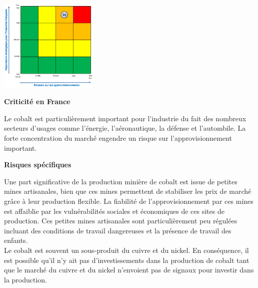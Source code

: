 \begin{multicols}{2}
    \begin{center}
      \includegraphics[width=0.35\textwidth]{Illustration métaux/Cobalt_criticité.png} 
    \end{center}
    \begin{center}
    \textbf{Criticité en France}
    \end{center}
    Le cobalt est particulièrement important pour l'industrie du fait des nombreux secteurs d'usages comme l'énergie, l'aéronautique, la défense et l'autombile. La forte concentration du marché engendre un risque sur l'approvisionnement important.
\end{multicols}

\begin{center}
    \textbf{Risques spécifiques}
\end{center}
Une part significative de la production minière de cobalt est issue de petites mines artisanales, bien que ces mines permettent de stabiliser les prix de marché grâce à leur production flexible. La fiabilité de l'approvisionnement par ces mines est affaiblie par les vulnérabilités sociales et économiques de ces sites de production. Ces petites mines artisanales sont particulièrement peu régulées incluant des conditions de travail dangereuses et la présence de travail des enfants.\\
Le cobalt est souvent un sous-produit du cuivre et du nickel. En conséquence, il est possible qu'il n'y ait pas d'investissements dans la production de cobalt tant que le marché du cuivre et du nickel n'envoient pas de signaux pour investir dans la production.